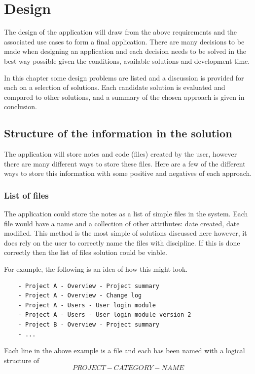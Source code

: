 \chapter{Design}\label{design}

The design of the application will draw from the above requirements and
the associated use cases to form a final application. There are many
decisions to be made when designing an application and each decision needs to
be solved in the best way possible given the conditions, available
solutions and development time.

In this chapter some design problems are listed and a discussion is provided
for each on a selection of solutions. Each candidate solution is evaluated and
compared to other solutions, and a summary of the chosen approach is given in
conclusion.

\section{Structure of the information in the solution}%
\label{structure-of-the-information-in-the-solution}

The application will store notes and code (files) created by the user, however
there are many different ways to store these files. Here are a few of the
different ways to store this information with some positive and negatives of each approach.

\subsection{List of files}\label{list-of-files}

The application could store the notes as a list of simple files in the system.
Each file would have a name and a collection of other attributes: date created,
date modified. This method is the most simple of solutions discussed here
however, it does rely on the user to correctly name the files with discipline.
If this is done correctly then the list of files solution could be viable.

For example, the following is an idea of how this might look.

\begin{verbatim}
    - Project A - Overview - Project summary
    - Project A - Overview - Change log
    - Project A - Users - User login module
    - Project A - Users - User login module version 2
    - Project B - Overview - Project summary
    - ...
\end{verbatim}
Each line in the above example is a file and each has been named with a logical
structure of $$ PROJECT - CATEGORY - NAME $$

